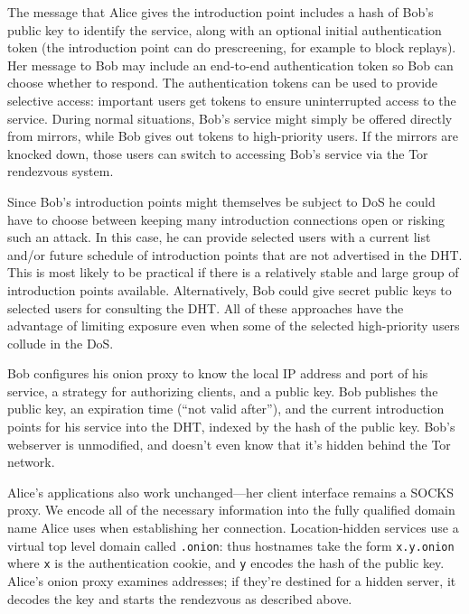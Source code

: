 \documentclass[times,10pt,twocolumn]{article}
\begin{document}
The message that Alice gives
the introduction point includes a hash of Bob's public key to identify
the service, along with an optional initial authentication token (the
introduction point can do prescreening, for example to block replays). Her
message to Bob may include an end-to-end authentication token so Bob
can choose whether to respond.
The authentication tokens can be used to provide selective access:
important users get tokens to ensure uninterrupted access to the
service. During normal situations, Bob's service might simply be offered
directly from mirrors, while Bob gives out tokens to high-priority users. If
the mirrors are knocked down,
those users can switch to accessing Bob's service via
the Tor rendezvous system.

Since Bob's introduction points might themselves be subject to DoS he
could have to choose between keeping many
introduction connections open or risking such an attack. In this case,
he can provide selected users
with a current list and/or future schedule of introduction points that
are not advertised in the DHT\@. This is most likely to be practical
if there is a relatively stable and large group of introduction points
available. Alternatively, Bob could give secret public keys
to selected users for consulting the DHT\@. All of these approaches
have the advantage of limiting exposure even when
some of the selected high-priority users collude in the DoS\@.


Bob configures his onion proxy to know the local IP address and port of his
service, a strategy for authorizing clients, and a public key. Bob
publishes the public key, an expiration time (``not valid after''), and
the current introduction points for his service into the DHT, indexed
by the hash of the public key.  Bob's webserver is unmodified,
and doesn't even know that it's hidden behind the Tor network.

Alice's applications also work unchanged---her client interface
remains a SOCKS proxy. We encode all of the necessary information
into the fully qualified domain name Alice uses when establishing her
connection. Location-hidden services use a virtual top level domain
called {\tt .onion}: thus hostnames take the form {\tt x.y.onion} where
{\tt x} is the authentication cookie, and {\tt y} encodes the hash of
the public key. Alice's onion proxy
examines addresses; if they're destined for a hidden server, it decodes
the key and starts the rendezvous as described above.
\end{document}
